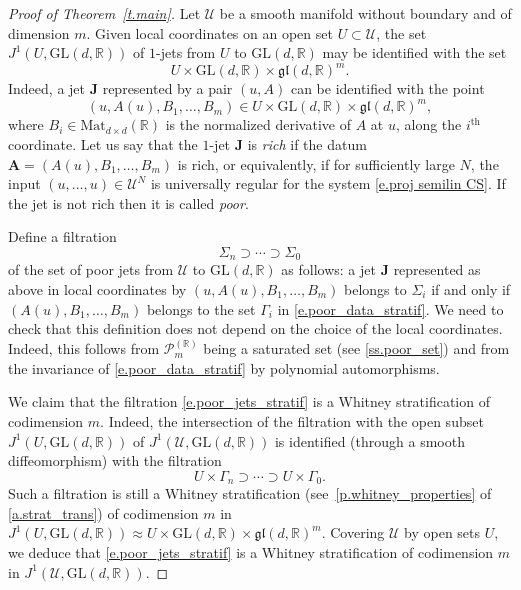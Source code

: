 \documentclass[10pt, a4paper]{amsart}
\theoremstyle{plain}
\theoremstyle{definition}
\theoremstyle{remark}
\theoremstyle{note}
\numberwithin{equation}{section}
\begin{document}
\begin{proof}[Proof of Theorem~\ref{t.main}]
Let ${\mathcal{U}}$ be a smooth manifold without boundary and of dimension $m$. 
Given local coordinates on an open set $U\subset {\mathcal{U}}$, the set $J^1(U,{\mathrm{GL}}(d,{\mathbb{R}}))$ of $1$-jets from $U$ to ${\mathrm{GL}}(d,{\mathbb{R}})$ may be identified with the set $$U \times {\mathrm{GL}}(d,{\mathbb{R}}) \times {\mathfrak{gl}}(d,{\mathbb{R}})^m.$$ 
Indeed, a jet ${\mathbf{J}}$ represented by a pair $(u,A)$ can be identified with the point 
$$(u,A(u),B_1, \dots ,B_m)\in U \times {\mathrm{GL}}(d,{\mathbb{R}}) \times  {\mathfrak{gl}}(d,{\mathbb{R}})^m,$$
where $B_i\in {\mathrm{Mat}}_{d \times d}({\mathbb{R}})$ is the normalized derivative 
of $A$ at $u$, 
along the $i^\text{th}$ coordinate. 
Let us say that the $1$-jet ${\mathbf{J}}$ is \emph{rich}
if the datum ${\mathbf{A}} = (A(u),B_1, \dots ,B_m)$ is rich,
or equivalently, if for sufficiently large $N$,
the input $(u,\ldots,u)\in {\mathcal{U}}^N$ is universally regular for the system \eqref{e.proj semilin CS}.
If the jet is not rich then it is called \emph{poor}.

Define a filtration 
\begin{equation}\label{e.poor_jets_stratif}
\Sigma_n  \supset \cdots \supset \Sigma_0
\end{equation}
of the set of poor jets from ${\mathcal{U}}$ to ${\mathrm{GL}}(d,{\mathbb{R}})$ as follows:
a jet ${\mathbf{J}}$ represented as above in local coordinates by $(u,A(u),B_1, \dots ,B_m)$
belongs to $\Sigma_i$ if and only if $(A(u), B_1, \dots ,B_m)$ belongs to 
the set $\Gamma_i$ in \eqref{e.poor_data_stratif}.
We need to check that this definition does not depend on the choice of the local coordinates.
Indeed, this follows from ${\mathcal{P}}_m^{({\mathbb{R}})}$ being a saturated set
(see \cref{ss.poor_set}) and from the invariance of \eqref{e.poor_data_stratif} by polynomial automorphisms.

We claim that the filtration \eqref{e.poor_jets_stratif} is a Whitney stratification 
of codimension $m$.
Indeed, the intersection of the filtration 
with the open subset $J^1(U,{\mathrm{GL}}(d,{\mathbb{R}}))$ of $J^1({\mathcal{U}},{\mathrm{GL}}(d,{\mathbb{R}}))$
is identified (through a smooth diffeomorphism) with the filtration 
$$
U \times \Gamma_n \supset \cdots \supset U \times \Gamma_0.
$$
Such a filtration is still a Whitney stratification (see~\cref{p.whitney_properties} of  \cref{a.strat_trans}) of codimension $m$ in $J^1(U,{\mathrm{GL}}(d,{\mathbb{R}}))\approx U \times {\mathrm{GL}}(d,{\mathbb{R}}) \times {\mathfrak{gl}}(d,{\mathbb{R}})^m$. Covering ${\mathcal{U}}$ by open sets $U$, we deduce that \eqref{e.poor_jets_stratif} is a Whitney stratification of codimension $m$ in $J^1({\mathcal{U}},{\mathrm{GL}}(d,{\mathbb{R}}))$.


\end{proof}
\end{document}
